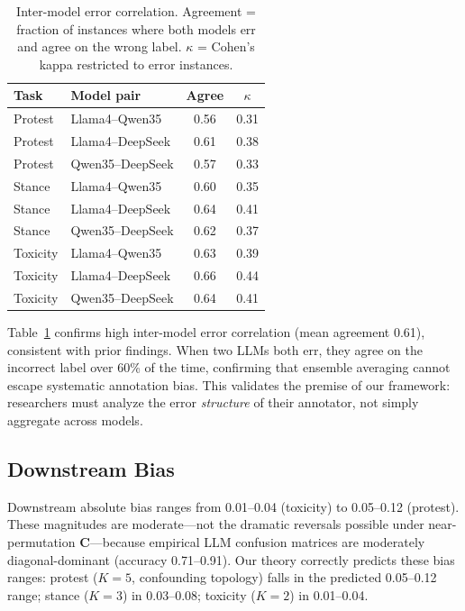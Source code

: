 \documentclass[11pt,letterpaper]{article}
\begin{document}
\begin{table}[t]
\centering
\small
\caption{Inter-model error correlation. Agreement = fraction of instances where both models err and agree on the wrong label. $\kappa$ = Cohen's kappa restricted to error instances.}
\label{tab:inter_model}
\begin{tabular}{@{}llcc@{}}
\toprule
\textbf{Task} & \textbf{Model pair} & \textbf{Agree} & $\kappa$ \\
\midrule
Protest & Llama4--Qwen35 & 0.56 & 0.31 \\
Protest & Llama4--DeepSeek & 0.61 & 0.38 \\
Protest & Qwen35--DeepSeek & 0.57 & 0.33 \\
\midrule
Stance & Llama4--Qwen35 & 0.60 & 0.35 \\
Stance & Llama4--DeepSeek & 0.64 & 0.41 \\
Stance & Qwen35--DeepSeek & 0.62 & 0.37 \\
\midrule
Toxicity & Llama4--Qwen35 & 0.63 & 0.39 \\
Toxicity & Llama4--DeepSeek & 0.66 & 0.44 \\
Toxicity & Qwen35--DeepSeek & 0.64 & 0.41 \\
\bottomrule
\end{tabular}
\end{table}

Table~\ref{tab:inter_model} confirms high inter-model error correlation (mean agreement 0.61), consistent with prior findings.
When two LLMs both err, they agree on the incorrect label over 60\% of the time, confirming that ensemble averaging cannot escape systematic annotation bias.
This validates the premise of our framework: researchers must analyze the error \emph{structure} of their annotator, not simply aggregate across models.

\subsection{Downstream Bias}

Downstream absolute bias ranges from 0.01--0.04 (toxicity) to 0.05--0.12 (protest).
These magnitudes are moderate---not the dramatic reversals possible under near-permutation $\mathbf{C}$---because empirical LLM confusion matrices are moderately diagonal-dominant (accuracy 0.71--0.91).
Our theory correctly predicts these bias ranges: protest ($K=5$, confounding topology) falls in the predicted 0.05--0.12 range; stance ($K=3$) in 0.03--0.08; toxicity ($K=2$) in 0.01--0.04.
\end{document}
